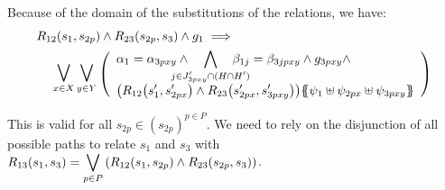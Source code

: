 \documentclass[runningheads]{llncs}
\begin{document}
\begin{enumerate}
Because of the domain of the substitutions of the relations, we have:
\begin{align*}
R_{12}\mpar{s_1, s_{2p}} \wedge R_{23}\mpar{s_{2p},s_3} \wedge g_1 \implies 
\hspace{5.5cm}\\
\operatorname*{\bigsymb{\bigvee}}_{x \in X} 
\operatorname*{\bigsymb{\bigvee}}_{y \in Y}
\mpar{\everymath{\displaystyle}
\begin{array}{l}
\alpha_1=\alpha_{3pxy}\wedge \bigwedge_\subbox{j \in J'_{3pxy} \cap (H\cap H')} \beta_{1j}=\beta_{3jpxy} \wedge g_{3pxy}\wedge \\
\mpar{R_{12}\mpar{s'_1, s'_{2px}} \wedge R_{23}\mpar{s'_{2px}, s'_{3pxy}}}\psubst{\psi_1 \uplus \psi_{2px} \uplus \psi_{3pxy}}
\end{array}}
\end{align*}	

This is valid for all $s_{2p} \in (s_{2p})^{p\in P}$. We need to rely on the disjunction of all possible paths to relate $s_1$ and $s_3$ with ${\displaystyle R_{13}(s_1,s_3)=\bigvee_{{p\in P}}{\left(R_{12}{\left(s_1,s_{2p}\right)} \wedge R_{23}{\left(s_{2p},s_3\right)}\right)}}$.


\end{enumerate}
\end{document}
